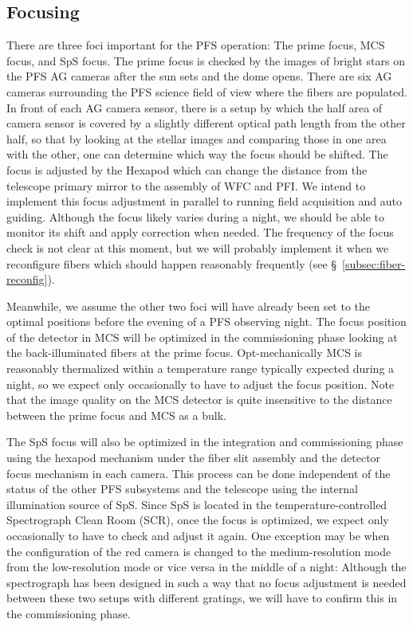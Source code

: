 \documentclass[a4paper]{article}
\begin{document}
\subsection{Focusing\label{sec:detail_ope_plan:focusing}}
There are three foci important for the PFS operation: The prime focus,
MCS focus, and SpS focus. The prime focus is checked by the images of
bright stars on the PFS AG cameras after the sun sets and the dome
opens. There are six AG cameras surrounding the PFS science field of
view where the fibers are populated. In front of each AG camera
sensor, there is a setup by which the half area of camera sensor is
covered by a slightly different optical path length from the other
half, so that by looking at the stellar images and comparing those in
one area with the other, one can determine which way the focus should
be shifted. The focus is adjusted by the Hexapod which can change the
distance from the telescope primary mirror to the assembly of WFC and
PFI. We intend to implement this focus adjustment in parallel to
running field acquisition and auto guiding. Although the focus likely
varies during a night, we should be able to monitor its shift and apply
correction when needed. The frequency of the focus check is not clear
at this moment, but we will probably implement it when we reconfigure
fibers which should happen reasonably frequently (see
\S~\ref{subsec:fiber-reconfig}).

Meanwhile, we assume the other two foci will have already been set to
the optimal positions before the evening of a PFS observing night. The
focus position of the detector in MCS will be optimized in the
commissioning phase looking at the back-illuminated fibers at the
prime focus. Opt-mechanically MCS is reasonably thermalized within a
temperature range typically expected during a night, so we expect only
occasionally to have to adjust the focus position. Note that the image
quality on the MCS detector is quite insensitive to the distance
between the prime focus and MCS as a bulk.

The SpS focus will also be optimized in the integration and
commissioning phase using the hexapod mechanism under the fiber slit
assembly and the detector focus mechanism in each camera. This process
can be done independent of the status of the other PFS subsystems and
the telescope using the internal illumination source of SpS. Since SpS
is located in the temperature-controlled Spectrograph Clean Room
(SCR), once the focus is optimized, we expect only occasionally to
have to check and adjust it again. One exception may be when the
configuration of the red camera is changed to the medium-resolution
mode from the low-resolution mode or vice versa in the middle of a
night: Although the spectrograph has been designed in such a way that
no focus adjustment is needed between these two setups with different
gratings, we will have to confirm this in the commissioning phase.
\end{document}
